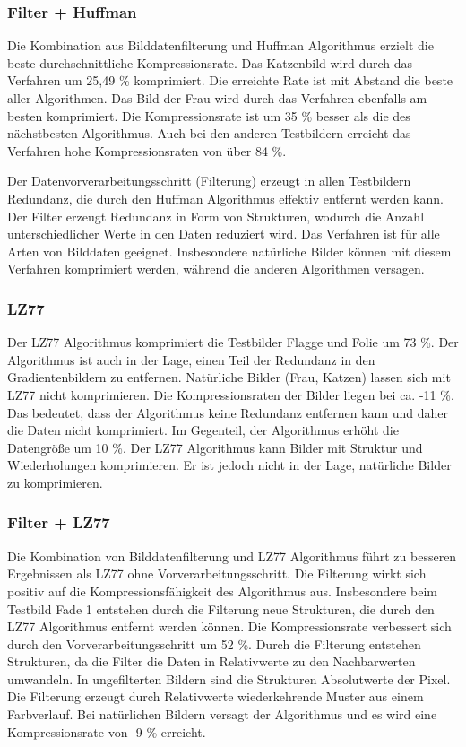\documentclass[conference]{IEEEtran}
\begin{document}
\subsubsection{Filter + Huffman}

Die Kombination aus Bilddatenfilterung und Huffman Algorithmus erzielt die
beste durchschnittliche Kompressionsrate.
Das Katzenbild wird durch das Verfahren um 25,49 \% komprimiert.
Die erreichte Rate ist mit Abstand die beste aller Algorithmen.
Das Bild der Frau wird durch das Verfahren ebenfalls am besten komprimiert.
Die Kompressionsrate ist um 35 \% besser als die des nächstbesten Algorithmus.
Auch bei den anderen Testbildern erreicht das Verfahren hohe Kompressionsraten von über 84 \%.

Der Datenvorverarbeitungsschritt (Filterung) erzeugt in allen Testbildern Redundanz, die
durch den Huffman Algorithmus effektiv entfernt werden kann.
Der Filter erzeugt Redundanz in Form von Strukturen, wodurch die Anzahl unterschiedlicher
Werte in den Daten reduziert wird.
Das Verfahren ist für alle Arten von Bilddaten geeignet.
Insbesondere natürliche Bilder können mit diesem Verfahren komprimiert werden, während
die anderen Algorithmen versagen.


\subsubsection{LZ77}

Der LZ77 Algorithmus komprimiert die Testbilder Flagge und Folie um 73 \%.
Der Algorithmus ist auch in der Lage, einen Teil der Redundanz in den Gradientenbildern
zu entfernen.
Natürliche Bilder (Frau, Katzen) lassen sich mit LZ77 nicht komprimieren.
Die Kompressionsraten der Bilder liegen bei ca. -11 \%.
Das bedeutet, dass der Algorithmus keine Redundanz entfernen kann und daher die Daten
nicht komprimiert.
Im Gegenteil, der Algorithmus erhöht die Datengröße um 10 \%.
Der LZ77 Algorithmus kann Bilder mit Struktur und Wiederholungen komprimieren.
Er ist jedoch nicht in der Lage, natürliche Bilder zu komprimieren.

\subsubsection{Filter + LZ77}

Die Kombination von Bilddatenfilterung und LZ77 Algorithmus führt zu besseren
Ergebnissen als LZ77 ohne Vorverarbeitungsschritt.
Die Filterung wirkt sich positiv auf die Kompressionsfähigkeit des Algorithmus aus.
Insbesondere beim Testbild Fade 1 entstehen durch die Filterung neue Strukturen,
die durch den LZ77 Algorithmus entfernt werden können.
Die Kompressionsrate verbessert sich durch den Vorverarbeitungsschritt um 52 \%.
Durch die Filterung entstehen Strukturen, da die Filter die Daten in
Relativwerte zu den Nachbarwerten umwandeln.
In ungefilterten Bildern sind die Strukturen Absolutwerte der Pixel.
Die Filterung erzeugt durch Relativwerte wiederkehrende Muster aus einem Farbverlauf.
Bei natürlichen Bildern versagt der Algorithmus und es wird eine
Kompressionsrate von -9 \% erreicht.
\end{document}
